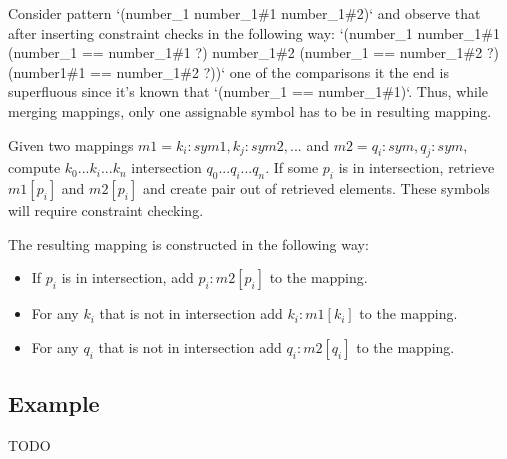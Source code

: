 Consider pattern `(number\_1 number\_1\#1 number\_1\#2)` and observe that after inserting constraint checks in the following way: `(number\_1 number\_1\#1 (number\_1 == number\_1\#1 ?) number\_1\#2 (number\_1 == number\_1\#2 ?) (number1\#1 == number\_1\#2 ?))` one of the comparisons it the end is superfluous since it's known that `(number\_1 == number\_1\#1)`. Thus, while merging mappings, only one assignable symbol has to be in resulting mapping.

Given two mappings $m1 = {k_i: sym1, k_j: sym2, ...}$ and $m2 = {q_i: sym, q_j: sym}$, compute ${k_0 ... k_i ... k_n}$ intersection ${q_0 ... q_i ... q_n}$. If some $p_i$ is in intersection, retrieve $m1[p_i]$ and $m2[p_i]$ and create pair out of retrieved elements. These symbols will require constraint checking. 

The resulting mapping is constructed in the following way:
\begin{itemize}
\item
If $p_i$ is in intersection, add ${p_i: m2[p_i]}$ to the mapping.
\item
For any $k_i$ that is not in intersection add ${k_i: m1[k_i]}$ to the mapping.
\item
For any $q_i$ that is not in intersection add ${q_i: m2[q_i]}$ to the mapping.
\end{itemize}

\subsection{Example}
TODO

